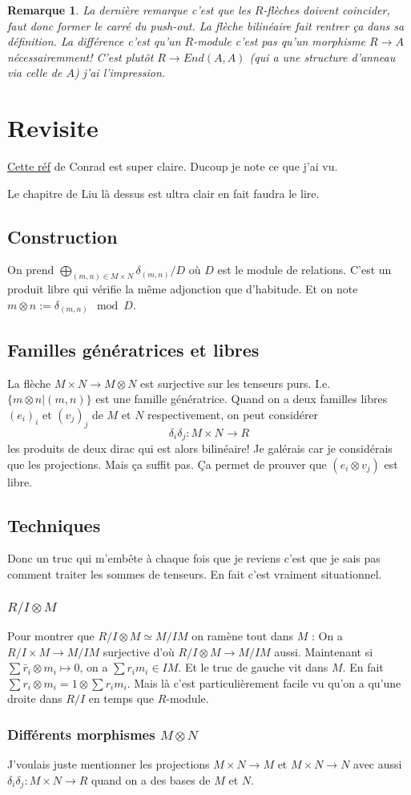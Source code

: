 \documentclass[a4paper,12pt]{book}
\theoremstyle{plain}
\newtheorem{rem}{Remarque}
\theoremstyle{definition}
\theoremstyle{remark}
\begin{document}
\begin{rem}
    La dernière remarque c'est que les $R$-flèches doivent
    coincider, faut donc former le carré du push-out. La flèche
    bilinéaire fait rentrer ça dans sa définition. La différence
    c'est qu'un $R$-module c'est pas qu'un morphisme $R\to A$ 
    nécessairemment! C'est plutôt $R\to End(A,A)$ (qui a une
    structure d'anneau via celle de $A$) j'ai
    l'impression.
\end{rem}

\chapter{Revisite}
\href{https://kconrad.math.uconn.edu/blurbs/linmultialg/tensorprod.pdf}{Cette réf}
de Conrad est super claire. Ducoup je note ce que j'ai vu.

Le chapitre de Liu là dessus est ultra clair en fait faudra 
le lire.

\section{Construction}
On prend $\bigoplus_{(m,n)\in M\times N}\delta_{(m,n)}/D$ où
$D$ est le module de relations. C'est un produit libre qui vérifie
la même adjonction que d'habitude. Et on note 
$m\otimes n:=\delta_{(m,n)}\mod D$.

\section{Familles génératrices et libres}
La flèche $M\times N\to M\otimes N$ est surjective sur les tenseurs
purs. I.e. $\{m\otimes n|(m,n)\}$ est une famille génératrice.
Quand on a deux familles libres $(e_i)_i$ et $(v_j)_j$ de 
$M$ et $N$ respectivement, on peut considérer 
\[\delta_i\delta_j\colon M\times N\to R\]
les produits de deux dirac qui est alors bilinéaire! Je galérais
car je considérais que les projections. Mais ça suffit pas.
Ça permet de prouver que $(e_i\otimes v_j)$ est libre.

\section{Techniques}
Donc un truc qui m'embête à chaque fois que je reviens c'est que
je sais pas comment traiter les sommes de tenseurs. En fait 
c'est vraiment situationnel.
\subsection{$R/I\otimes M$}
Pour montrer que $R/I\otimes M\simeq M/IM$ on ramène tout
dans $M$ : On a $R/I\times M\to M/IM$ surjective d'où 
$R/I\otimes M\to M/IM$ aussi. Maintenant si 
$\sum \bar r_i\otimes m_i\mapsto 0$, on a $\sum r_im_i\in IM$.
Et le truc de gauche vit dans $M$. En fait $\sum r_i\otimes m_i
=1\otimes \sum r_im_i$. 
Mais là c'est particulièrement facile vu qu'on a qu'une droite
dans $R/I$ en temps que $R$-module.

\subsection{Différents morphismes $M\otimes N$}
J'voulais juste mentionner les projections $M\times N\to M$ et
$M\times N\to N$ avec aussi 
$\delta_i\delta_j\colon M\times N\to R$ quand on a des bases
de $M$ et $N$.
\end{document}
